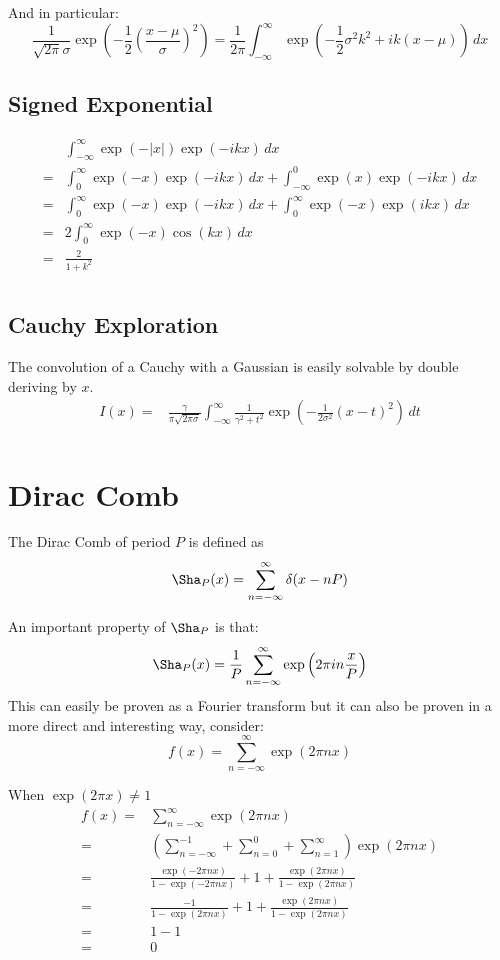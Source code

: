 \documentclass[12pt]{report}
\begin{document}
And in particular:
\[ \frac{1}{\sqrt{2\pi}\sigma} \exp\left(-\frac{1}{2}\left(\frac{x-\mu}{\sigma}\right)^2\right) = \frac{1}{2\pi}\int_{-\infty}^{\infty}\exp\left(-\frac{1}{2}\sigma^2k^2+ik(x-\mu)\right) \,dx \] 
\subsection{Signed Exponential}
\begin{equation*}
\begin{aligned}
&\int_{-\infty}^{\infty}\exp(-|x|)\exp(-ikx)\,dx \\
=& \int_{0}^{\infty}\exp(-x)\exp(-ikx)\,dx+\int_{-\infty}^{0}\exp(x)\exp(-ikx)\,dx\\
=& \int_{0}^{\infty}\exp(-x)\exp(-ikx)\,dx+\int^{\infty}_{0}\exp(-x)\exp(ikx)\,dx\\
=& 2\int_{0}^{\infty}\exp(-x)\cos(kx)\,dx\\
=& \frac{2}{1+k^2}\\
\end{aligned}
\end{equation*}
\subsection{Cauchy Exploration}
The convolution of a Cauchy with a Gaussian is easily solvable by double deriving by $x$.
\begin{equation*}
\begin{aligned}
I(x) =&\frac{\gamma}{\pi\sqrt{2\pi\sigma}}\int_{-\infty}^{\infty}\frac{1}{\gamma^2+t^2}\exp\left(-\frac{1}{2\sigma^2}(x-t)^2\right)\,dt\\
\end{aligned}
\end{equation*}

\section{Dirac Comb}
\label{appx:dirac-comb}
The Dirac Comb of period $P$ is defined as
\[\Sha_P(x) = \sum_{n=-\infty}^{\infty}\delta(x-nP) \] 

An important property of $\Sha_P$ is that:
\[\Sha_P(x) = \frac{1}{P}\sum_{n=-\infty}^{\infty}\exp\left(2\pi i n \frac{x}{P}\right)\]
This can easily be proven as a Fourier transform but it can also be proven in a more direct and interesting way, consider:
\[f(x) = \sum_{n=-\infty}^{\infty}\exp(2\pi n x)\]

When $\exp(2\pi x) \neq 1$
\begin{equation*}
\begin{aligned}
f(x) =& \sum_{n=-\infty}^{\infty}\exp(2\pi n x) \\
=& \left(\sum_{n=-\infty}^{-1}+\sum_{n=0}^{0}+\sum_{n=1}^{\infty}\right)\exp(2\pi n x) \\
=& \frac{\exp(-2\pi n x)}{1-\exp(-2\pi n x)} + 1 + \frac{\exp(2\pi n x)}{1-\exp(2\pi n x)} \\
=& \frac{-1}{1-\exp(2\pi n x)} + 1 + \frac{\exp(2\pi n x)}{1-\exp(2\pi n x)} \\
=& 1-1\\
=& 0\\
\end{aligned}
\end{equation*}
\end{document}
